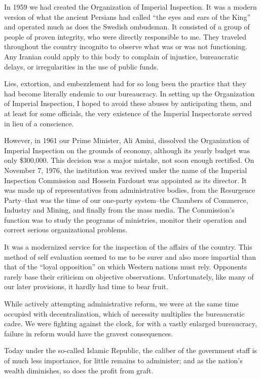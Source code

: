 In 1959 we had created the Organization of Imperial Inspection. It was a modern version of what the ancient Persians had called “the eyes and ears of the King” and operated much as does the Swedish ombudsman. It consisted of a group of people of proven integrity, who were directly responsible to me. They traveled throughout the country incognito to observe what was or was not functioning. Any Iranian could apply to this body to complain of injustice, bureaucratic delays, or irregularities in the use of public funds. 

Lies, extortion, and embezzlement had for so long been the practice that they had become literally endemic to our bureaucracy. In setting up the Organization of Imperial Inspection, I hoped to avoid these abuses by anticipating them, and at least for some officials, the very existence of the Imperial Inspectorate served in lieu of a conscience. 

However, in 1961 our Prime Minister, Ali Amini, dissolved the Organization of Imperial Inspection on the grounds of economy, although its yearly budget was only \$300,000. This decision was a major mistake, not soon enough rectified. On November 7, 1976, the institution was revived under the name of the Imperial Inspection Commission and Hossein Fardoust was appointed as its director. It was made up of representatives from administrative bodies, from the Resurgence Party--that was the time of our one-party system--the Chambers of Commerce, Industry and Mining, and finally from the mass media. The Commission’s function was to study the programs of ministries, monitor their operation and correct serious organizational problems. 

It was a modernized service for the inspection of the affairs of the country. This method of self evaluation seemed to me to be surer and also more impartial than that of the “loyal opposition” on which Western nations must rely. Opponents rarely base their criticism on objective observations. Unfortunately, like many of our later provisions, it hardly had time to bear fruit. 

While actively attempting administrative reform, we were at the same time occupied with decentralization, which of necessity multiplies the bureaucratic cadre. We were fighting against the clock, for with a vastly enlarged bureaucracy, failure in reform would have the gravest consequences. 

Today under the so-called Islamic Republic, the caliber of the government staff is of much less importance, for little remains to administer; and as the nation's wealth diminishes, so does the profit from graft. 


